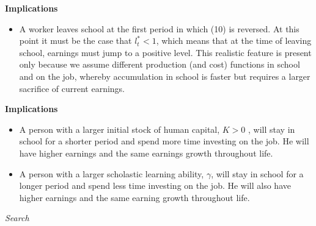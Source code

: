 \begin{frame}\textbf{Implications}\vspace{0.3cm}

\begin{itemize}\setlength\itemsep{1em}
\item A worker leaves school at the first period in which (10) is reversed. At this point it must be the case that $l_t^* < 1$, which means that at the time of leaving school, earnings must jump to a positive level. This realistic feature is present only because we assume different production (and cost) functions in school and on the job, whereby accumulation in school is faster but requires a larger sacrifice of current earnings.
\end{itemize}

\end{frame}
\begin{frame}\textbf{Implications}\vspace{0.3cm}

\begin{itemize}\setlength\itemsep{1em}
\item A person with a larger initial stock of human capital, $K > 0$ , will stay in school for a shorter period and spend more time investing on the job. He will have higher earnings and the same earnings growth throughout life.
\item A person with a larger scholastic learning ability, $\gamma$, will stay in school for a longer period and spend less time investing on the job. He will also have higher earnings and the same earning growth throughout life.
\end{itemize}

\end{frame}
\begin{frame}\begin{center}
	\LARGE\textit{Search}
\end{center}\end{frame}
